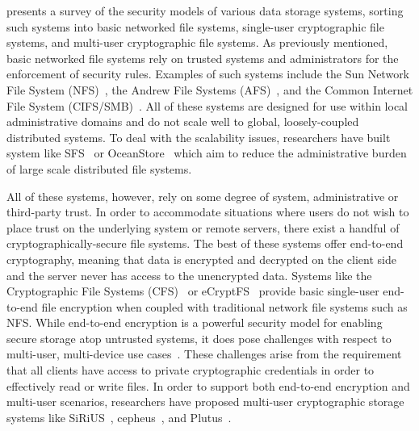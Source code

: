 \cite{kher2005} presents a survey of the security models of various
data storage systems, sorting such systems into basic networked file
systems, single-user cryptographic file systems, and multi-user
cryptographic file systems. As previously mentioned, basic networked
file systems rely on trusted systems and administrators for the
enforcement of security rules. Examples of such systems include the
Sun Network File System (NFS)~\cite{sandberg1985}, the Andrew File
Systems (AFS)~\cite{howard1988}, and the Common Internet File System
(CIFS/SMB)~\cite{microsoft-smb2}. All of these systems are designed
for use within local administrative domains and do not scale well to
global, loosely-coupled distributed systems. To deal with the
scalability issues, researchers have built system like
SFS~\cite{mazieres1999} or OceanStore~\cite{kubiatowicz2000} which aim
to reduce the administrative burden of large scale distributed file
systems.

All of these systems, however, rely on some degree of system,
administrative or third-party trust. In order to accommodate
situations where users do not wish to place trust on the underlying
system or remote servers, there exist a handful of
cryptographically-secure file systems. The best of these systems offer
end-to-end cryptography, meaning that data is encrypted and decrypted
on the client side and the server never has access to the unencrypted
data.  Systems like the Cryptographic File Systems
(CFS)~\cite{blaze1993} or eCryptFS~\cite{ecryptfs} provide basic
single-user end-to-end file encryption when coupled with traditional
network file systems such as NFS. While end-to-end encryption is a
powerful security model for enabling secure storage atop untrusted
systems, it does pose challenges with respect to multi-user,
multi-device use cases~\cite{miltchev2008}. These challenges arise
from the requirement that all clients have access to private
cryptographic credentials in order to effectively read or write
files. In order to support both end-to-end encryption and multi-user
scenarios, researchers have proposed multi-user cryptographic storage
systems like SiRiUS~\cite{goh2003}, cepheus~\cite{fu1998}, and
Plutus~\cite{kallahalla2003}.

